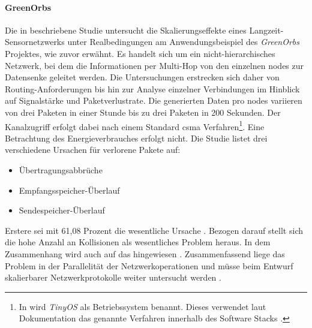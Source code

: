 \paragraph{GreenOrbs} Die in \cite{GreenOrbs} beschriebene Studie untersucht die Skalierungseffekte eines Langzeit-Sensornetzwerks unter Realbedingungen am Anwendungsbeispiel des \emph{GreenOrbs} Projektes, wie zuvor erwähnt. Es handelt sich um ein nicht-hierarchisches Netzwerk, bei dem die Informationen per Multi-Hop von den einzelnen \glspl{node} zur Datensenke geleitet werden.  Die Untersuchungen erstrecken sich daher von Routing-Anforderungen bis hin zur Analyse einzelner Verbindungen im Hinblick auf Signalstärke und Paketverlustrate. Die generierten Daten pro \glspl{node} variieren von drei Paketen in einer Stunde bis zu drei Paketen in 200 Sekunden. Der Kanalzugriff erfolgt dabei nach einem Standard \ac{csma} Verfahren\footnote{In \cite{GreenOrbs} wird \emph{TinyOS} als Betriebssystem benannt. Dieses verwendet laut Dokumentation das genannte Verfahren innerhalb des Software Stacks \citep{tinyOS}.}. Eine Betrachtung des Energieverbrauches erfolgt nicht. 
Die Studie listet drei verschiedene Ursachen für verlorene Pakete auf:
\begin{itemize}
	\item Übertragungsabbrüche
	\item Empfangsspeicher-Überlauf
	\item Sendespeicher-Überlauf
\end{itemize}
Erstere sei mit 61,08 Prozent die wesentliche Ursache \cite{GreenOrbs}. Bezogen darauf stellt sich die hohe Anzahl an Kollisionen als wesentliches Problem heraus. In dem Zusammenhang wird auch auf das  hingewiesen \cite{GreenOrbs}. Zusammenfassend liege das Problem in der Parallelität der Netzwerkoperationen und müsse beim Entwurf skalierbarer Netzwerkprotokolle weiter untersucht werden \cite{GreenOrbs}.

